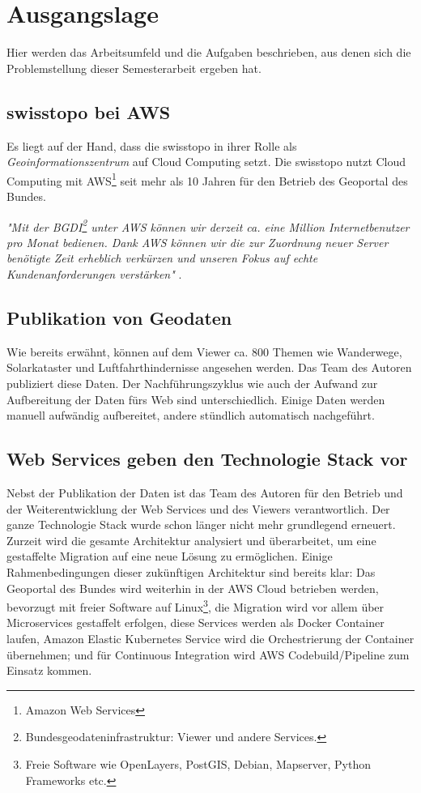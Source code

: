 \section{Ausgangslage}
Hier werden das Arbeitsumfeld und die Aufgaben beschrieben, aus denen sich die Problemstellung dieser Semesterarbeit ergeben hat.

\subsection{swisstopo bei AWS}
Es liegt auf der Hand, dass die swisstopo in ihrer Rolle als \emph{Geoinformationszentrum} auf Cloud Computing setzt. Die swisstopo nutzt Cloud Computing mit AWS\footnote{Amazon Web Services} seit mehr als 10 Jahren für den Betrieb des Geoportal des Bundes.
 
\textit{"Mit der BGDI\footnote{Bundesgeodateninfrastruktur: Viewer und andere Services.} unter AWS können wir derzeit ca. eine Million Internetbenutzer pro Monat bedienen. Dank AWS können wir die zur Zuordnung neuer Server benötigte Zeit erheblich verkürzen und unseren Fokus auf echte Kundenanforderungen verstärken"} \cite{Christ2020}.


\subsection{Publikation von Geodaten}
Wie bereits erwähnt, können auf dem Viewer ca. 800 Themen wie Wanderwege, Solarkataster und Luftfahrthindernisse angesehen werden. Das Team des Autoren publiziert diese Daten. Der Nachführungszyklus wie auch der Aufwand zur
Aufbereitung der Daten fürs Web sind unterschiedlich. Einige Daten werden manuell aufwändig aufbereitet, andere
stündlich automatisch nachgeführt.

\subsection{Web Services geben den Technologie Stack vor}\label{kap:webservices}
Nebst der Publikation der Daten ist das Team des Autoren für den Betrieb und der Weiterentwicklung der Web Services
und des Viewers verantwortlich. Der ganze Technologie Stack wurde schon länger nicht mehr grundlegend erneuert. Zurzeit wird
die gesamte Architektur analysiert und überarbeitet, um eine gestaffelte Migration auf eine neue
Lösung zu ermöglichen.
Einige Rahmenbedingungen dieser zukünftigen Architektur sind bereits klar: Das Geoportal des
Bundes wird weiterhin in der AWS Cloud betrieben werden, bevorzugt mit freier Software auf Linux\footnote{Freie Software \cite{FS2010} wie OpenLayers, PostGIS, Debian, Mapserver, Python Frameworks etc.}, die Migration wird vor allem über Microservices gestaffelt erfolgen, diese Services werden als Docker Container laufen, Amazon Elastic Kubernetes Service wird die Orchestrierung der Container übernehmen; und für Continuous
Integration wird AWS Codebuild/Pipeline zum Einsatz kommen.

